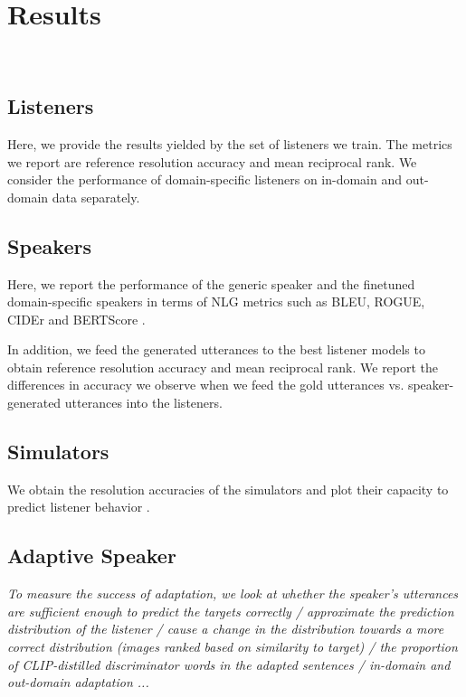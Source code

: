 
\section{Results}
\label{sec:results}

\\


\subsection{Listeners}
Here, we provide the results yielded by the set of listeners we train. The metrics we report are reference resolution accuracy and mean reciprocal rank. We consider the performance of domain-specific listeners on in-domain and out-domain data separately. 

\subsection{Speakers}
Here, we  report the performance of the generic speaker and the finetuned domain-specific speakers in terms of NLG metrics such as BLEU, ROGUE, CIDEr and BERTScore . 

In addition, we feed the generated utterances to the best listener models to obtain reference resolution accuracy and mean reciprocal rank. We report the differences in accuracy we observe when we feed the gold utterances vs. speaker-generated utterances into the listeners.

\subsection{Simulators}
We obtain the resolution accuracies of the simulators and plot their capacity to predict listener behavior . 

\subsection{Adaptive Speaker}

\textit{To measure the success of adaptation, we look at whether the speaker's utterances are sufficient enough to predict the targets correctly / approximate the prediction distribution of the listener / cause a change in the distribution towards a more correct distribution (images ranked based on similarity to target) / the proportion of CLIP-distilled discriminator words in the adapted sentences / in-domain and out-domain adaptation ...}
